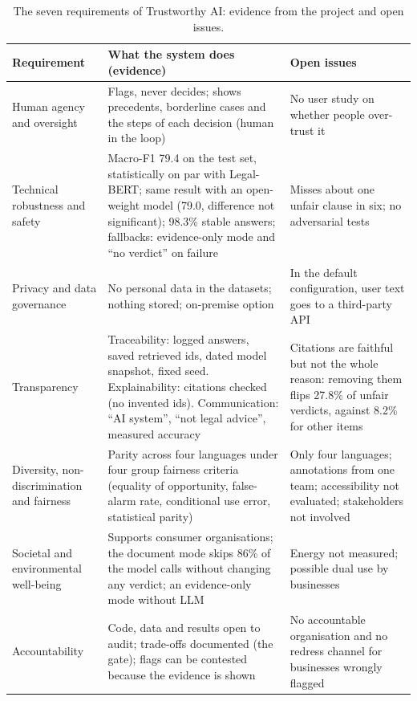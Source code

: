 \begin{table}[t]
\centering\small
\caption{The seven requirements of Trustworthy AI: evidence from the project and open issues.}
\label{tab:hleg}
\begin{tabularx}{\textwidth}{@{}P{2.6cm}YY@{}}
\toprule
Requirement & What the system does (evidence) & Open issues \\
\midrule
Human agency and oversight & Flags, never decides; shows precedents, borderline cases and the steps of each decision (human in the loop) & No user study on whether people over-trust it \\
Technical robustness and safety & Macro-F1 79.4 on the test set, statistically on par with Legal-BERT; same result with an open-weight model (79.0, difference not significant); 98.3\% stable answers; fallbacks: evidence-only mode and ``no verdict'' on failure & Misses about one unfair clause in six; no adversarial tests \\
Privacy and data governance & No personal data in the datasets; nothing stored; on-premise option & In the default configuration, user text goes to a third-party API \\
Transparency & Traceability: logged answers, saved retrieved ids, dated model snapshot, fixed seed. Explainability: citations checked (no invented ids). Communication: ``AI system'', ``not legal advice'', measured accuracy & Citations are faithful but not the whole reason: removing them flips 27.8\% of unfair verdicts, against 8.2\% for other items \\
Diversity, non-discrimination and fairness & Parity across four languages under four group fairness criteria (equality of opportunity, false-alarm rate, conditional use error, statistical parity) & Only four languages; annotations from one team; accessibility not evaluated; stakeholders not involved \\
Societal and environmental well-being & Supports consumer organisations; the document mode skips 86\% of the model calls without changing any verdict; an evidence-only mode without LLM & Energy not measured; possible dual use by businesses \\
Accountability & Code, data and results open to audit; trade-offs documented (the gate); flags can be contested because the evidence is shown & No accountable organisation and no redress channel for businesses wrongly flagged \\
\bottomrule
\end{tabularx}
\end{table}

